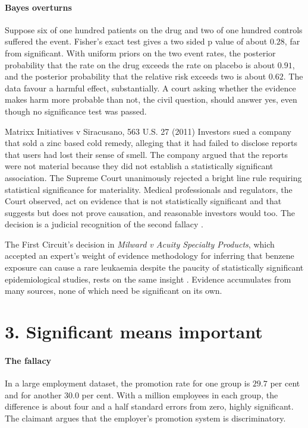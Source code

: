 \paragraph{Bayes overturns} Suppose six of one hundred patients on the drug and two of one hundred controls suffered the event. Fisher's exact test gives a two sided p value of about $0.28$, far from significant. With uniform priors on the two event rates, the posterior probability that the rate on the drug exceeds the rate on placebo is about $0.91$, and the posterior probability that the relative risk exceeds two is about $0.62$. The data favour a harmful effect, substantially. A court asking whether the evidence makes harm more probable than not, the civil question, should answer yes, even though no significance test was passed.

\begin{casebox}{Matrixx Initiatives v Siracusano, 563 U.S. 27 (2011)}
Investors sued a company that sold a zinc based cold remedy, alleging that it had failed to disclose reports that users had lost their sense of smell. The company argued that the reports were not material because they did not establish a statistically significant association. The Supreme Court unanimously rejected a bright line rule requiring statistical significance for materiality. Medical professionals and regulators, the Court observed, act on evidence that is not statistically significant and that suggests but does not prove causation, and reasonable investors would too. The decision is a judicial recognition of the second fallacy \citep{matrixx2011}.
\end{casebox}

The First Circuit's decision in \emph{Milward v Acuity Specialty Products}, which accepted an expert's weight of evidence methodology for inferring that benzene exposure can cause a rare leukaemia despite the paucity of statistically significant epidemiological studies, rests on the same insight \citep{milward2011}. Evidence accumulates from many sources, none of which need be significant on its own.

\section{3. Significant means important}

\paragraph{The fallacy} In a large employment dataset, the promotion rate for one group is $29.7$ per cent and for another $30.0$ per cent. With a million employees in each group, the difference is about four and a half standard errors from zero, highly significant. The claimant argues that the employer's promotion system is discriminatory.

